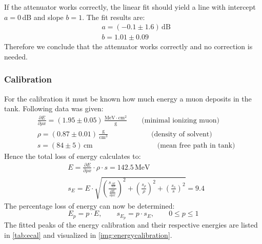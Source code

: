 If the attenuator works correctly, the linear fit should yield a line with intercept $a=0$\,dB and slope $b=1$. The fit results are:
\begin{equation}
    \begin{split}
        & a = (-0.1 \pm 1.6)\,\text{dB} \\
        & b = 1.01  \pm 0.09 
    \end{split}
\end{equation}
Therefore we conclude that the attenuator works correctly and no correction is needed.

\subsubsection{Calibration}
For the calibration it must be known how much energy a muon deposits in the tank. Following data was given:
\begin{equation}
    \begin{split}
        & \frac{\partial E}{\partial \rho x} = (1.95 \pm 0.05)\,\frac{\text{MeV}\cdot\text{cm}^2}{\text{g}} \qquad \text{(minimal ionizing muon)}  \\
        & \rho = (0.87 \pm 0.01) \, \frac{\text{g}}{\text{cm}^3}  \qquad \qquad \qquad \text{(density of solvent)} \\
        & s = (84 \pm 5) \, \text{cm} \qquad \qquad \qquad \qquad \quad  \text{(mean free path in tank)}
    \end{split}
\end{equation}
Hence the total loss of energy calculates to:
\begin{equation}
    \begin{split}
        & E = \frac{\partial E}{\partial \rho x} \cdot \rho \cdot s = 142.5\,\text{MeV} \\
        & s_{E} = E \cdot \sqrt{ \left( \frac{s_{\frac{\partial E}{\partial \rho x}}}{\frac{\partial E}{\partial \rho x}} \right)^2 + \left( \frac{s_\rho}{\rho} \right)^2 + \left( \frac{s_s}{s} \right)^2  }
        = 9.4
    \end{split}
\end{equation}
The percentage loss of energy can now be determined:
\begin{equation}
    E_p = p \cdot E, \qquad s_{E_p} = p \cdot s_E, \qquad 0 \leq p \leq 1
\end{equation}
The fitted peaks of the energy calibration and their respective energies are listed in \autoref{tab:ecal} and visualized in \autoref{img:energycalibration}.

